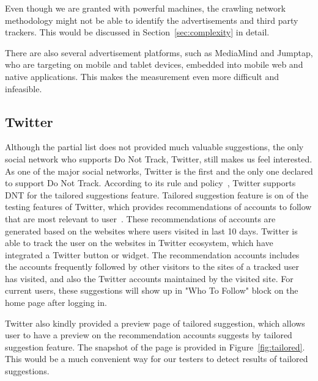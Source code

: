 \documentclass{sig-alternate}
\begin{document}
Even though we are granted with powerful machines, the crawling network methodology might not be able to identify the advertisements and third party trackers. This would be discussed in Section~\ref{sec:complexity} in detail.

There are also several advertisement platforms, such as MediaMind and Jumptap, who are targeting on mobile and tablet devices, embedded into mobile web and native applications. This makes the measurement even more difficult and infeasible.

\subsection{Twitter}

Although the partial list does not provided much valuable suggestions, the only social network who supports Do Not Track, Twitter, still makes us feel interested. As one of the major social networks, Twitter is the first and the only one declared to support Do Not Track. According to its rule and policy~\cite{twitterdnt}, Twitter supports DNT for the tailored suggestions feature. Tailored suggestion feature is on of the testing features of Twitter, which provides recommendations of accounts to follow that are most relevant to user~\cite{twitterfaq}. These recommendations of accounts are generated based on the websites where users visited in last 10 days. Twitter is able to track the user on the websites in Twitter ecosystem, which have integrated a Twitter button or widget. The recommendation accounts includes the accounts frequently followed by other visitors to the sites of a tracked user has visited, and also the Twitter accounts maintained by the visited site. For current users, these suggestions will show up in "Who To Follow" block on the home page after logging in.

Twitter also kindly provided a preview page of tailored suggestion, which allows user to have a preview on the recommendation accounts suggests by tailored suggestion feature. The snapshot of the page is provided in Figure~\ref{fig:tailored}. This would be a much convenient way for our testers to detect results of tailored suggestions.
\end{document}
